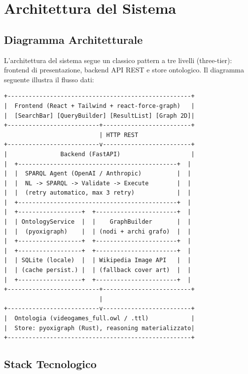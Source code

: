 \section{Architettura del Sistema}
\label{sec:architettura}

\subsection{Diagramma Architetturale}

L'architettura del sistema segue un classico pattern a tre livelli (three-tier):
frontend di presentazione, backend API REST e store ontologico. Il diagramma
seguente illustra il flusso dati:

\begin{center}
\begin{minipage}{0.9\textwidth}
\small
\begin{verbatim}
+----------------------------------------------------+
|  Frontend (React + Tailwind + react-force-graph)   |
|  [SearchBar] [QueryBuilder] [ResultList] [Graph 2D]|
+--------------------------+-------------------------+
                           | HTTP REST
+--------------------------v-------------------------+
|               Backend (FastAPI)                    |
|  +---------------------------------------------+  |
|  |  SPARQL Agent (OpenAI / Anthropic)          |  |
|  |  NL -> SPARQL -> Validate -> Execute        |  |
|  |  (retry automatico, max 3 retry)            |  |
|  +---------------------------------------------+  |
|  +------------------+  +-----------------------+  |
|  | OntologyService  |  |    GraphBuilder       |  |
|  |  (pyoxigraph)    |  | (nodi + archi grafo)  |  |
|  +------------------+  +-----------------------+  |
|  +------------------+  +-----------------------+  |
|  | SQLite (locale)  |  | Wikipedia Image API   |  |
|  | (cache persist.) |  | (fallback cover art)  |  |
|  +------------------+  +-----------------------+  |
+--------------------------+-------------------------+
                           |
+--------------------------v-------------------------+
|  Ontologia (videogames_full.owl / .ttl)            |
|  Store: pyoxigraph (Rust), reasoning materializzato|
+----------------------------------------------------+
\end{verbatim}
\end{minipage}
\end{center}

\subsection{Stack Tecnologico}


